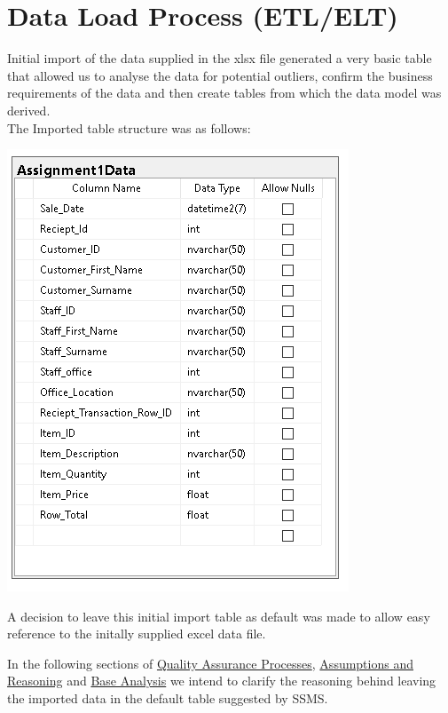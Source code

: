 \documentclass{article}
\begin{document}
    \section{Data Load Process (ETL/ELT)}
        Initial import of the data supplied in the xlsx file generated a very basic table
        that allowed us to analyse the data for potential outliers, confirm the business
        requirements of the data and then create tables from which the data model was derived.
        \\
        The Imported table structure was as follows:
        \begin{center}
            \includegraphics{Images/Initial_Import.PNG}
        \end{center}

        A decision to leave this initial import table as default
        was made to allow easy reference to the initally supplied
        excel data file.
        \par
        In the following sections of \hyperref[sec:QAP]{\color{blue}Quality Assurance Processes}, \hyperref[sec:AR]{\color{blue}Assumptions and Reasoning} and \hyperref[sec:BA]{\color{blue}Base Analysis} we intend to clarify the reasoning behind leaving the imported data in
        the default table suggested by SSMS.

        \newpage
\end{document}
